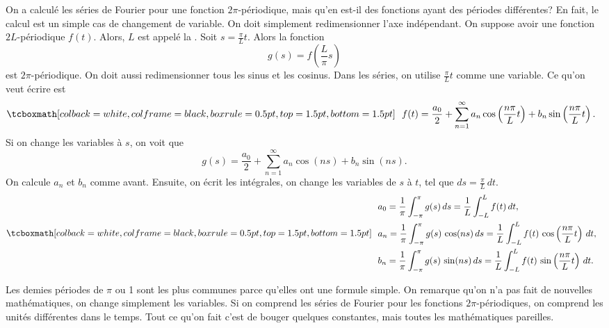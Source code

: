 On a calculé les séries de Fourier pour une fonction $2\pi$-périodique, mais qu'en est-il des fonctions ayant des périodes différentes? En fait, le calcul est un simple cas de changement de variable. On doit simplement  redimensionner l'axe indépendant. On suppose avoir une fonction  $2L$-périodique $f(t)$.  Alors, $L$ est appelé la  \emph{}.  Soit $s = \frac{\pi}{L}  t$.
Alors la fonction
\begin{equation*}
g(s) = f\left(\frac{L}{\pi} s \right)
\end{equation*}
est $2\pi$-périodique.  On doit aussi redimensionner tous les sinus et les cosinus. Dans les séries, on utilise $\frac{\pi}{L} t$ comme une variable. Ce qu'on veut écrire est
\begin{equation*}
\mybxbg{~~
f(t) = 
\frac{a_0}{2} +
\sum_{n=1}^\infty a_n \cos \left( \frac{n \pi}{L} t \right)
+ b_n \sin \left(\frac{n \pi}{L} t \right) .
~~}
\end{equation*}
Si on change les variables à $s$, on voit que 
\begin{equation*}
g(s) = 
\frac{a_0}{2} +
\sum_{n=1}^\infty a_n \cos (n s)
+ b_n \sin (n s) .
\end{equation*}
On calcule $a_n$ et $b_n$ comme avant.  Ensuite, on écrit les intégrales, on change les variables de $s$ à $t$, tel que $ds = \frac{\pi}{L} \, dt$.
\begin{equation*}
\mybxbg{~~
\begin{aligned}
& a_0 =
\frac{1}{\pi}
\int_{-\pi}^\pi
g(s) \, ds
=
\frac{1}{L}
\int_{-L}^L
f(t) \, dt , \\
& a_n =
\frac{1}{\pi}
\int_{-\pi}^\pi
g(s) \, \cos (n s) \, ds
=
\frac{1}{L}
\int_{-L}^L
f(t) \, \cos \left( \frac{n \pi}{L} t \right) \, dt , \\
& b_n =
\frac{1}{\pi}
\int_{-\pi}^\pi
g(s) \, \sin (n s) \, ds
=
\frac{1}{L}
\int_{-L}^L
f(t) \, \sin \left( \frac{n \pi}{L} t \right) \, dt .
\end{aligned}
~~}
\end{equation*}

Les demies périodes de $\pi$ ou 1 sont les plus communes parce qu'elles ont une formule simple. On remarque qu'on n'a pas fait de nouvelles mathématiques, on change simplement les variables. Si on comprend les séries de Fourier pour les fonctions  $2\pi$-périodiques, on comprend les unités différentes dans le temps. Tout ce qu'on fait c'est de bouger quelques constantes, mais toutes les mathématiques pareilles.  

